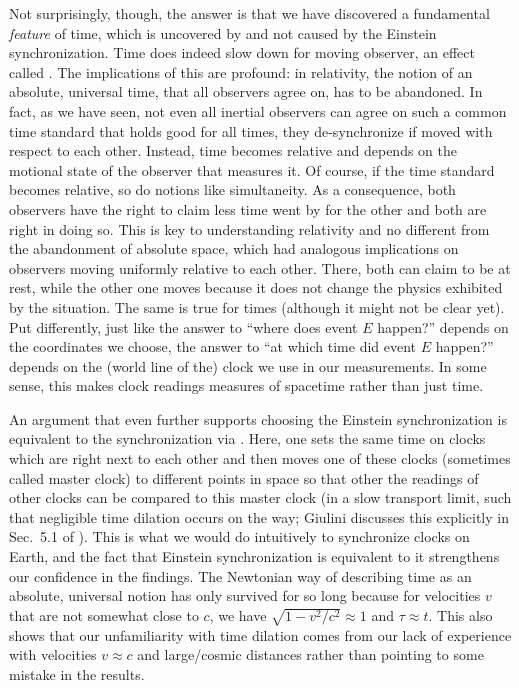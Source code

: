 \documentclass[../relativity_main.tex]{subfiles}
\begin{document}
Not surprisingly, though, the answer is that we have discovered a fundamental \emph{feature} of time, which is uncovered by and not caused by the Einstein synchronization. Time does indeed slow down for moving observer, an effect called . The implications of this are profound: in relativity, the notion of an absolute, universal time, that all observers agree on, has to be abandoned. In fact, as we have seen, not even all inertial observers can agree on such a common time standard that holds good for all times, they de-synchronize if moved with respect to each other. Instead, time becomes relative and depends on the motional state of the observer that measures it. Of course, if the time standard becomes relative, so do notions like simultaneity. As a consequence, both observers have the right to claim less time went by for the other and both are right in doing so. This is key to understanding relativity and no different from the abandonment of absolute space, which had analogous implications on observers moving uniformly relative to each other. There, both can claim to be at rest, while the other one moves because it does not change the physics exhibited by the situation. The same is true for times (although it might not be clear yet). Put differently, just like the answer to \enquote{where does event $E$ happen?} depends on the coordinates we choose, the answer to \enquote{at which time did event $E$ happen?} depends on the (world line of the) clock we use in our measurements. In some sense, this makes clock readings measures of spacetime rather than just time.



An argument that even further supports choosing the Einstein synchronization is equivalent to the synchronization via . Here, one sets the same time on clocks which are right next to each other and then moves one of these clocks (sometimes called master clock) to different points in space so that other the readings of other clocks can be compared to this master clock (in a slow transport limit, such that negligible time dilation occurs on the way; Giulini discusses this explicitly in Sec.~5.1 of \cite{giulini_srt}). This is what we would do intuitively to synchronize clocks on Earth, and the fact that Einstein synchronization is equivalent to it strengthens our confidence in the findings. The Newtonian way of describing time as an absolute, universal notion has only survived for so long because for velocities $v$ that are not somewhat close to $c$, we have $\sqrt{1 - v^2 / c^2} \approx 1$ and $\tau \approx t$. This also shows that our unfamiliarity with time dilation comes from our lack of experience with velocities $v \approx c$ and large/cosmic distances rather than pointing to some mistake in the results.\\
\end{document}
